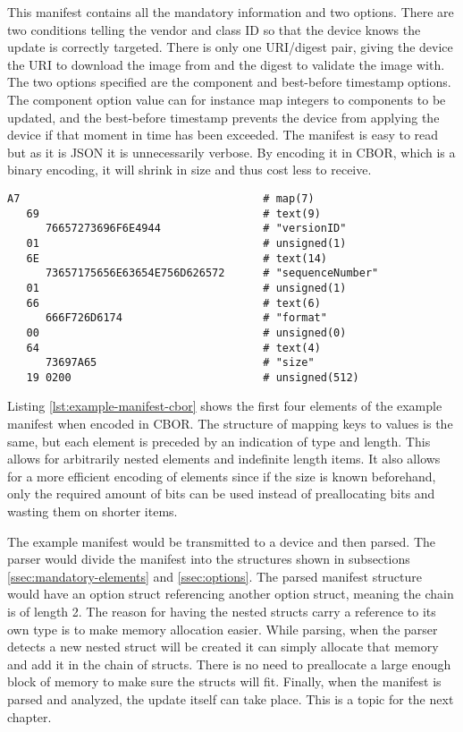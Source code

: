 \documentclass[0-thesis.tex]{subfiles}
\begin{document}
This manifest contains all the mandatory information and two options. There are two
conditions telling the vendor and class ID so that the device knows the update is
correctly targeted. There is only one URI/digest pair, giving the device the URI to
download the image from and the digest to validate the image with. The two options
specified are the component and best-before timestamp options. The component option value
can for instance map integers to components to be updated, and the best-before timestamp
prevents the device from applying the device if that moment in time has been exceeded. The
manifest is easy to read but as it is JSON it is unnecessarily verbose. By encoding it in
CBOR, which is a binary encoding, it will shrink in size and thus cost less to receive.

\begin{lstlisting}[caption={The first four elements of the example manifest in CBOR encoding.},
                    label={lst:example-manifest-cbor}]
A7                                      # map(7)
   69                                   # text(9)
      76657273696F6E4944                # "versionID"
   01                                   # unsigned(1)
   6E                                   # text(14)
      73657175656E63654E756D626572      # "sequenceNumber"
   01                                   # unsigned(1)
   66                                   # text(6)
      666F726D6174                      # "format"
   00                                   # unsigned(0)
   64                                   # text(4)
      73697A65                          # "size"
   19 0200                              # unsigned(512)
\end{lstlisting}

Listing \ref{lst:example-manifest-cbor} shows the first four elements of the example
manifest when encoded in CBOR. The structure of mapping keys to values is the same, but
each element is preceded by an indication of type and length. This allows for arbitrarily
nested elements and indefinite length items. It also allows for a more efficient encoding
of elements since if the size is known beforehand, only the required amount of bits can be
used instead of preallocating bits and wasting them on shorter items.

The example manifest would be transmitted to a device and then parsed. The parser would
divide the manifest into the structures shown in subsections \ref{ssec:mandatory-elements}
and \ref{ssec:options}. The parsed manifest structure would have an option struct
referencing another option struct, meaning the chain is of length 2. The reason for having
the nested structs carry a reference to its own type is to make memory allocation easier.
While parsing, when the parser detects a new nested struct will be created it can simply
allocate that memory and add it in the chain of structs. There is no need to preallocate a
large enough block of memory to make sure the structs will fit. Finally, when the manifest
is parsed and analyzed, the update itself can take place. This is a topic for the next
chapter.
\end{document}
